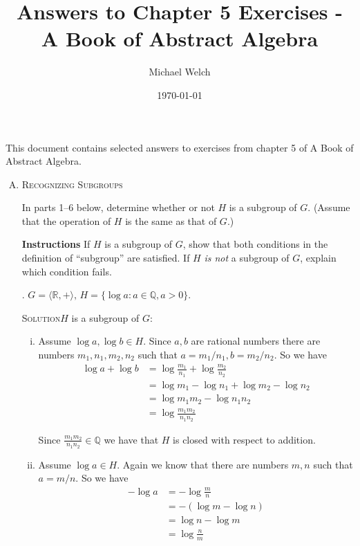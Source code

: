 \documentclass[twoside]{amsart}
\newcommand{\solution}{\textsc{Solution}\xspace}
\begin{document}
\title{Answers to Chapter 5 Exercises - A Book of Abstract Algebra}
\author{Michael Welch}
\date{\today}
\maketitle

This document contains selected answers to exercises from chapter 5
of A Book of Abstract Algebra.


\begin{enumerate}[A.]
   \item \textsc{Recognizing Subgroups}

   \noindent In parts 1--6 below, determine whether or not $H$ is a
   subgroup of $G$. (Assume that the operation of $H$ is the same as
   that of $G$.)

   \textbf{Instructions} If $H$ is a subgroup of $G$, show that
   both conditions in the definition of ``subgroup'' are satisfied.
   If $H$ \emph{is not} a subgroup of $G$, explain which condition
   fails.
  

   . $G = \langle \mathbb{R},+ \rangle,\, H = 
   \{\log a : a \in \mathbb{Q}, a > 0 \}$.

   \noindent \solution $H$ is a subgroup of $G$:
   \begin{enumerate}[(i)]
      \item Assume $\log a, \log b \in H$. Since $a,b$ are rational numbers
      there are numbers $m_1,n_1,m_2,n_2$ such that $a = m_1/n_1, b = m_2/n_2$.
      So we have 
      \begin{align*}
         \log a + \log b & = \log \frac{m_1}{n_1} + \log \frac{m_2}{n_2} \\
	                 & = \log m_1 - \log n_1 + \log m_2 - \log n_2 \\
			 & = \log m_1m_2 - \log n_1n_2 \\
			 & = \log \frac{m_1m_2}{n_1n_2}
      \end{align*}

      Since $\displaystyle \frac{m_1m_2}{n_1n_2} \in \mathbb{Q}$ 
      we have that $H$ is closed with respect to addition.

      \item Assume $\log a \in H$. Again we know that there are numbers
      $m,n$ such that $a = m/n$. So we have
      \begin{align*}
         - \log a & = - \log \frac{m}{n} \\
	          & = - (\log m - \log n) \\
		  & = \log n - \log m \\
		  & = \log \frac{n}{m}
      \end{align*}


\end{enumerate}
\end{enumerate}
\end{document}
